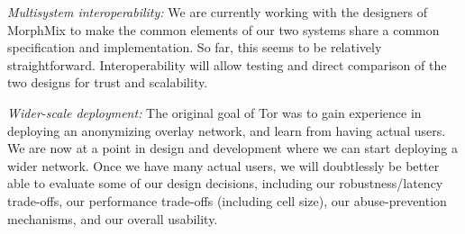 \documentclass[times,10pt,twocolumn]{article}
\begin{document}
\emph{Multisystem interoperability:} We are currently working with the
designers of MorphMix to make the common elements of our two systems
share a common specification and implementation. So far, this seems
to be relatively straightforward.  Interoperability will allow testing
and direct comparison of the two designs for trust and scalability.

\emph{Wider-scale deployment:} The original goal of Tor was to
gain experience in deploying an anonymizing overlay network, and
learn from having actual users.  We are now at a point in design
and development where we can start deploying a wider network.  Once
we have many actual users, we will doubtlessly be better
able to evaluate some of our design decisions, including our
robustness/latency trade-offs, our performance trade-offs (including
cell size), our abuse-prevention mechanisms, and
our overall usability.






\end{document}
